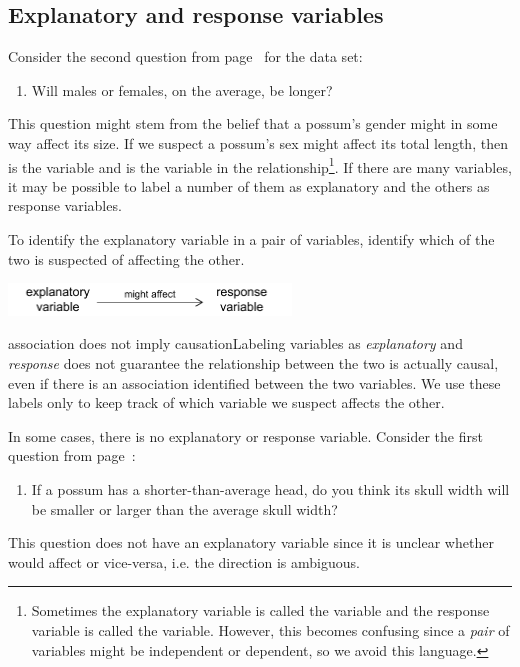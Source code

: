 \subsection{Explanatory and response variables}
\label{explanatoryAndResponse}

Consider the second question from page~\pageref{possibleCausationQuestionForPossums} for the  data set:
\begin{enumerate}
\item[(2)] Will males or females, on the average, be longer?
\end{enumerate}
This question might stem from the belief that a possum's gender might in some way affect its size. If we suspect a possum's sex might affect its total length, then  is the  variable and  is the  variable in the relationship\footnote{Sometimes the explanatory variable is called the  variable and the response variable is called the  variable. However, this becomes confusing since a \emph{pair} of variables might be independent or dependent, so we avoid this language.}. If there are many variables, it may be possible to label a number of them as explanatory and the others as response variables.

\begin{tipBox}{
To identify the explanatory variable in a pair of variables, identify which of the two is suspected of affecting the other.

\hspace{10mm}\includegraphics[height=0.34in]{01/figures/expResp/expResp}}
\end{tipBox}

\begin{caution}{association does not imply causation}{Labeling variables as \emph{explanatory} and \emph{response} does not guarantee the relationship between the two is actually causal, even if there is an association identified between the two variables. We use these labels only to keep track of which variable we suspect affects the other.}
\end{caution}

In some cases, there is no explanatory or response variable. Consider the first question from page~\pageref{countyPovertyIncomeQuestion}:
\begin{enumerate}
\item[(1)] If a possum has a shorter-than-average head, do you think its skull width will be smaller or larger than the average skull width?
\end{enumerate}
This question does not have an explanatory variable since it is unclear whether  would affect  or vice-versa, i.e. the direction is ambiguous.

